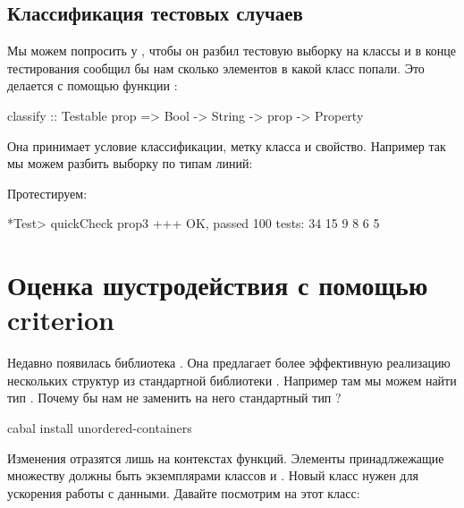 \subsection{Классификация тестовых случаев}

Мы можем попросить у , чтобы
он разбил тестовую выборку на классы и в конце
тестирования сообщил бы нам сколько элементов в 
какой класс попали. Это делается с помощью функции
:

\begin{code}
classify :: Testable prop => Bool -> String -> prop -> Property
\end{code}

Она принимает условие классификации, метку класса и свойство.
Например так мы можем разбить выборку по типам линий:


Протестируем:

\begin{code}
*Test> quickCheck prop3
+++ OK, passed 100 tests:
34%
15%
 9%
 8%
 6%
 5%
\end{code}


\section{Оценка шустродействия с помощью criterion}

Недавно появилась библиотека . 
Она предлагает более эффективную реализацию нескольких
структур из стандартной библиотеки .
Например там мы можем найти тип . 
Почему бы нам не заменить на него стандартный тип ?

\begin{code}
cabal install unordered-containers
\end{code}

Изменения отразятся лишь на контекстах функций. 
Элементы принадлжежащие множеству 
должны быть экземплярами классов  и .
Новый класс  нужен для ускорения работы
с данными. Давайте посмотрим на этот класс:

